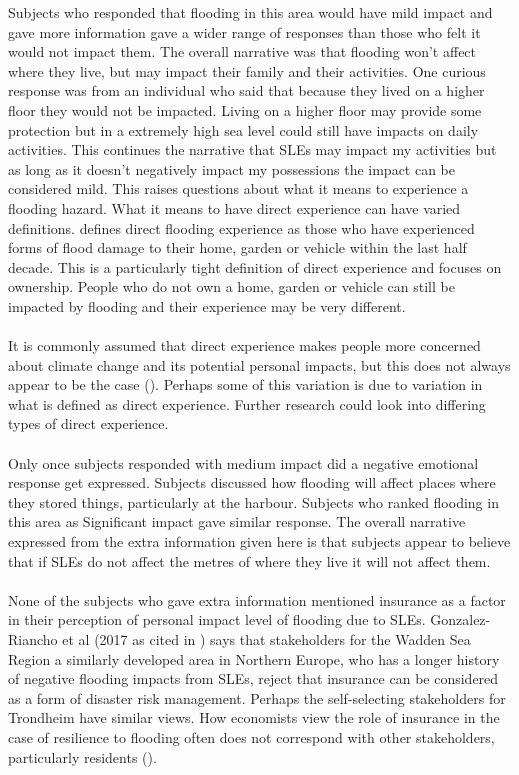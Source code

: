 Subjects who responded that flooding in this area would have mild impact and gave more information gave a wider range of responses than those who felt it would not impact them. The overall narrative was that flooding won’t affect where they live, but may impact their family and their activities. One curious response was from an individual who said that because they lived on a higher floor they would not be impacted. Living on a higher floor may provide some protection but in a extremely high sea level could still have impacts on daily activities. This continues the narrative that SLEs may impact my activities but as long as it doesn't negatively impact my possessions the impact can be considered mild. This raises questions about what it means to experience a flooding hazard. What it means to have direct experience can have varied definitions. 
\cite{whitmarsh_are_2008} defines direct flooding experience as those who have experienced forms of flood damage to their home, garden or vehicle within the last half decade. This is a particularly tight definition of direct experience and focuses on ownership. People who do not own a home, garden or vehicle can still be impacted by flooding and their experience may be very different.  
\paragraph{}
It is commonly assumed that direct experience makes people more concerned about climate change and its potential personal impacts, but this does not always appear to be the case (\cite{lujala_role_2020}). Perhaps some of this variation is due to variation in what is defined as direct experience. Further research could look into differing types of direct experience. 
\paragraph{}
Only once subjects responded with medium impact did a negative emotional response get expressed. Subjects discussed how flooding will affect places where they stored things, particularly at the harbour. Subjects who ranked flooding in this area as Significant impact gave similar response. The overall narrative expressed from the extra information given here is that subjects appear to believe that if SLEs do not affect the metres of where they live it will not affect them. 
\paragraph{}
None of the subjects who gave extra information mentioned insurance as a factor in their perception of personal impact level of flooding due to SLEs. Gonzalez-Riancho et al (2017 as cited in \cite{gerkensmeier_governing_2018}) says that stakeholders for the Wadden Sea Region a similarly developed area in Northern Europe, who has a longer history of negative flooding impacts from SLEs, reject that insurance can be considered as a form of disaster risk management. Perhaps the self-selecting stakeholders for Trondheim have similar views. How economists view the role of insurance in the case of resilience to flooding often does not correspond with other stakeholders, particularly residents (\cite{gerkensmeier_governing_2018}).

